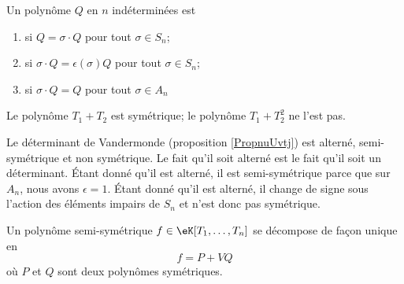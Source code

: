 \begin{definition}
    Un polynôme \( Q\) en \( n\) indéterminées est 
    \begin{enumerate}
        \item
             si \( Q=\sigma\cdot Q\) pour tout \( \sigma\in S_n\);
        \item
             si \( \sigma\cdot Q=\epsilon(\sigma)Q\) pour tout \( \sigma\in S_n\);
        \item
             si \( \sigma\cdot Q=Q\) pour tout \( \sigma\in A_n\)
    \end{enumerate}
\end{definition}
Le polynôme \( T_1+T_2\) est symétrique; le polynôme \( T_1+T_2^2\) ne l'est pas. 

\begin{example}
    Le déterminant de Vandermonde (proposition \ref{PropnuUvtj}) est alterné, semi-symétrique et non symétrique. Le fait qu'il soit alterné est le fait qu'il soit un déterminant. Étant donné qu'il est alterné, il est semi-symétrique parce que sur \( A_n\), nous avons \( \epsilon=1\). Étant donné qu'il est alterné, il change de signe sous l'action des éléments impairs de \( S_n\) et n'est donc pas symétrique.
\end{example}

\begin{proposition} \label{PropUDqXax}
    Un polynôme semi-symétrique \( f\in \eK[T_1,\ldots, T_n]\) se décompose de façon unique en
    \begin{equation}
        f=P+VQ
    \end{equation}
    où \( P\) et \( Q\) sont deux polynômes symétriques.
\end{proposition}

